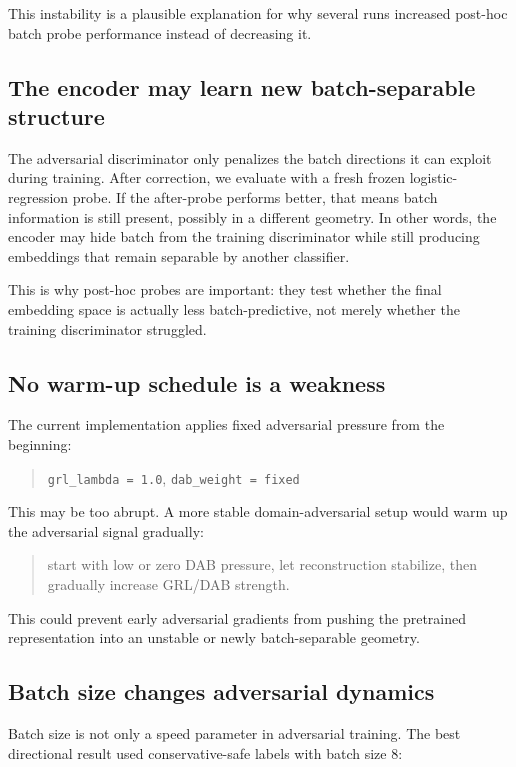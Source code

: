 \documentclass[11pt]{article}
\newcommand{\code}[1]{\texttt{\small #1}}
\begin{document}
This instability is a plausible explanation for why several runs increased post-hoc batch
probe performance instead of decreasing it.

\subsection{The encoder may learn new batch-separable structure}

The adversarial discriminator only penalizes the batch directions it can exploit during
training. After correction, we evaluate with a fresh frozen logistic-regression probe. If
the after-probe performs better, that means batch information is still present, possibly in
a different geometry. In other words, the encoder may hide batch from the training
discriminator while still producing embeddings that remain separable by another classifier.

This is why post-hoc probes are important: they test whether the final embedding space is
actually less batch-predictive, not merely whether the training discriminator struggled.

\subsection{No warm-up schedule is a weakness}

The current implementation applies fixed adversarial pressure from the beginning:

\begin{quote}
\code{grl\_lambda = 1.0}, \quad \code{dab\_weight = fixed}
\end{quote}

This may be too abrupt. A more stable domain-adversarial setup would warm up the
adversarial signal gradually:

\begin{quote}
start with low or zero DAB pressure, let reconstruction stabilize, then gradually increase
GRL/DAB strength.
\end{quote}

This could prevent early adversarial gradients from pushing the pretrained representation
into an unstable or newly batch-separable geometry.

\subsection{Batch size changes adversarial dynamics}

Batch size is not only a speed parameter in adversarial training. The best directional
result used conservative-safe labels with batch size 8:
\end{document}
